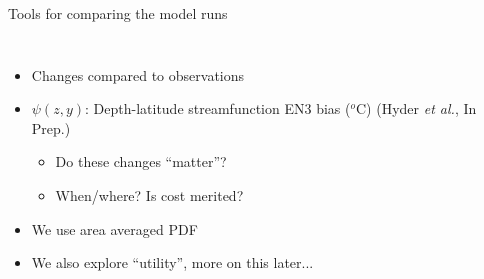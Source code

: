 \documentclass{beamer}
\begin{document}
\begin{frame}{Tools for comparing the model runs}
\begin{columns}[c]
\column{3in}
\begin{itemize}
 \item Changes compared to observations
 \item $\psi(z, y)$: Depth-latitude streamfunction EN3 bias ($^{o}$C) \small (Hyder \textit{et al.}, In Prep.)
 \begin{itemize}
  \item Do these changes ``matter''?
  \item When/where? Is cost \alert{merited}?
 \end{itemize}
 \item We use area averaged PDF%
 \item We also explore ``utility'', more on this later...
\end{itemize}
\end{columns}
\end{frame}




\end{document}
